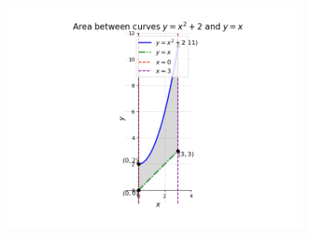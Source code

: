 \documentclass[journal]{IEEEtran}
\begin{document}
\begin{figure}[htp]
    \centering
    \includegraphics[width=10cm]{figs/Figure_1.png}
\end{figure}
\end{document}
